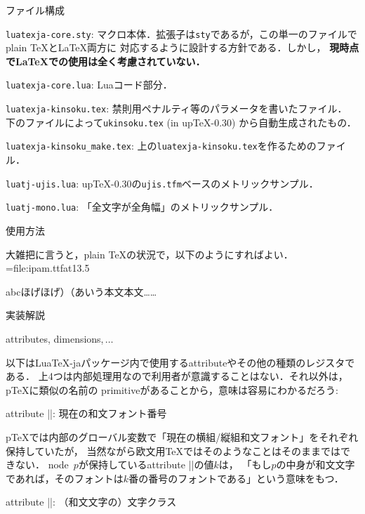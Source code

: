 \beginparagraph ファイル構成


\item {\tt luatexja-core.sty}: 
マクロ本体．拡張子は{\tt sty}であるが，この単一のファイルでplain \TeX と\LaTeX 両方に
対応するように設計する方針である．しかし，
{\bf 現時点で\LaTeX での使用は全く考慮されていない．}
\item {\tt luatexja-core.lua}: Luaコード部分．
\item {\tt luatexja-kinsoku.tex}: 禁則用ペナルティ等のパラメータを書いたファイル．
下のファイルによって{\tt ukinsoku.tex} (in up\TeX-0.30) から自動生成されたもの．
\item {\tt luatexja-kinsoku\_make.tex}: 上の{\tt luatexja-kinsoku.tex}を作るためのファイル．
\item {\tt luatj-ujis.lua}: up\TeX-0.30の{\tt ujis.tfm}ベースのメトリックサンプル．
\item {\tt luatj-mono.lua}: 「全文字が全角幅」のメトリックサンプル．
\enditem

\beginsection 使用方法

大雑把に言うと，plain \TeX の状況で，以下のようにすればよい．
\begintt
\font\tenipam={file:ipam.ttf}at13.5\jQ 
\jfont{}                     %
\tenipam{}\zw 
{}                 %

\rm abcほげほげ）（あいう本文本文……
\endtt

\beginsection 実装解説

\beginparagraph attributes, dimensions,$\,\ldots$

以下はLua\TeX-jaパッケージ内で使用するattributeやその他の種類のレジスタである．
上4つは内部処理用なので利用者が意識することはない．それ以外は，p\TeX に類似の名前の
primitiveがあることから，意味は容易にわかるだろう:

\item attribute |\luatexja@curjfn|: 現在の和文フォント番号

p\TeX では内部のグローバル変数で「現在の横組/縦組和文フォント」をそれぞれ保持していたが，
当然ながら欧文用\TeX ではそのようなことはそのままではできない．
node~$p$が保持しているattribute |\luatexja@curjfn|の値$k$は，
「もし$p$の中身が和文文字であれば，そのフォントは$k$番の番号のフォントである」という意味をもつ．

\item attribute |\luatexja@charclass|: （和文文字の）文字クラス

